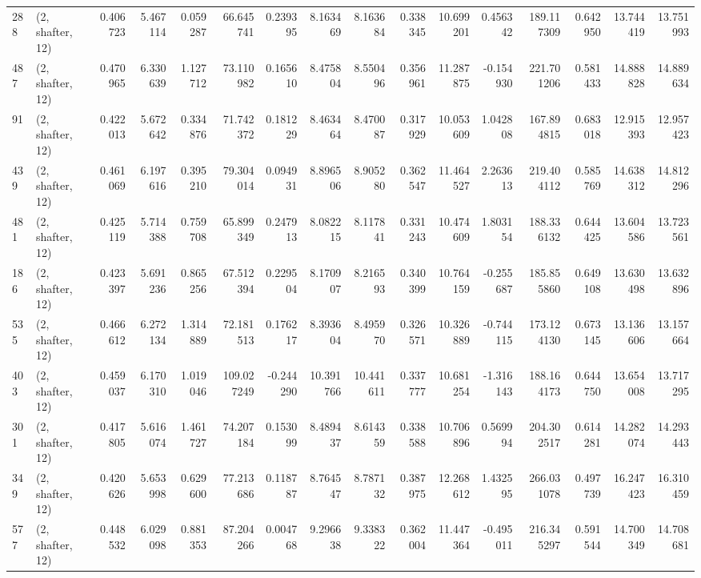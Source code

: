 \begin{tabular}{llrrrrrrrrrrrrrr}
288 &  (2, shafter, 12) &   0.406723 &   5.467114 &   0.059287 &    66.645741 &   0.239395 &   8.163469 &   8.163684 &  0.338345 &  10.699201 &   0.456342 &    189.117309 &   0.642950 &   13.744419 &   13.751993 \\
487 &  (2, shafter, 12) &   0.470965 &   6.330639 &   1.127712 &    73.110982 &   0.165610 &   8.475804 &   8.550496 &  0.356961 &  11.287875 &  -0.154930 &    221.701206 &   0.581433 &   14.888828 &   14.889634 \\
91  &  (2, shafter, 12) &   0.422013 &   5.672642 &   0.334876 &    71.742372 &   0.181229 &   8.463464 &   8.470087 &  0.317929 &  10.053609 &   1.042808 &    167.894815 &   0.683018 &   12.915393 &   12.957423 \\
439 &  (2, shafter, 12) &   0.461069 &   6.197616 &   0.395210 &    79.304014 &   0.094931 &   8.896506 &   8.905280 &  0.362547 &  11.464527 &   2.263613 &    219.404112 &   0.585769 &   14.638312 &   14.812296 \\
481 &  (2, shafter, 12) &   0.425119 &   5.714388 &   0.759708 &    65.899349 &   0.247913 &   8.082215 &   8.117841 &  0.331243 &  10.474609 &   1.803154 &    188.336132 &   0.644425 &   13.604586 &   13.723561 \\
186 &  (2, shafter, 12) &   0.423397 &   5.691236 &   0.865256 &    67.512394 &   0.229504 &   8.170907 &   8.216593 &  0.340399 &  10.764159 &  -0.255687 &    185.855860 &   0.649108 &   13.630498 &   13.632896 \\
535 &  (2, shafter, 12) &   0.466612 &   6.272134 &   1.314889 &    72.181513 &   0.176217 &   8.393604 &   8.495970 &  0.326571 &  10.326889 &  -0.744115 &    173.124130 &   0.673145 &   13.136606 &   13.157664 \\
403 &  (2, shafter, 12) &   0.459037 &   6.170310 &   1.019046 &   109.027249 &  -0.244290 &  10.391766 &  10.441611 &  0.337777 &  10.681254 &  -1.316143 &    188.164173 &   0.644750 &   13.654008 &   13.717295 \\
301 &  (2, shafter, 12) &   0.417805 &   5.616074 &   1.461727 &    74.207184 &   0.153099 &   8.489437 &   8.614359 &  0.338588 &  10.706896 &   0.569994 &    204.302517 &   0.614281 &   14.282074 &   14.293443 \\
349 &  (2, shafter, 12) &   0.420626 &   5.653998 &   0.629600 &    77.213686 &   0.118787 &   8.764547 &   8.787132 &  0.387975 &  12.268612 &   1.432595 &    266.031078 &   0.497739 &   16.247423 &   16.310459 \\
577 &  (2, shafter, 12) &   0.448532 &   6.029098 &   0.881353 &    87.204266 &   0.004768 &   9.296638 &   9.338322 &  0.362004 &  11.447364 &  -0.495011 &    216.345297 &   0.591544 &   14.700349 &   14.708681 \\

\end{tabular}
